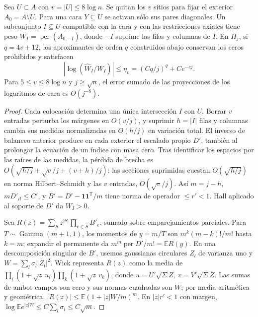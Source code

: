 \begin{proposicion}\label{prop:menores-llegada}
Sea \(U\subset A\) con \(v=|U|\le8\log n\). Se quitan los \(v\) sitios para fijar
el exterior \(A_0=A\setminus U\). Para una cara \(Y\subseteq U\) se activan sólo sus
pares diagonales. Un subconjunto \(I\subseteq U\) compatible con la cara y con las
restricciones axiales tiene peso \(W_I=\operatorname{per}(A_{0,-I})\), donde \(-I\)
suprime las filas y columnas de \(I\). En \(H_j\), si \(q=4v+12\), los aproximantes
de orden \(q\) construidos abajo conservan los ceros prohibidos y satisfacen
\[
 |\log(\widehat W_I/W_I)|\le\eta_v=(Cq/j)^q+Ce^{-cj}.
\]
Para \(5\le v\le8\log n\) y \(j\ge\sqrt n\), el error sumado de las proyecciones
de los logaritmos de cara es \(O(j^{-8})\).
\end{proposicion}
\begin{proof}
Cada colocación determina una única intersección \(I\) con \(U\). Borrar \(v\) entradas
perturba los márgenes en \(O(v/j)\), y suprimir \(h=|I|\) filas y columnas cambia sus
medidas normalizadas en \(O(h/j)\) en variación total. El inverso de balanceo anterior
produce en cada exterior el escalado propio \(D'\), también al prolongar la ecuación de
un índice con masa cero. Tras identificar los espacios por las raíces de las medidas, la
pérdida de brecha es \(O(\sqrt{h/j}+\sqrt v/j+(v+h)/j)\): las secciones suprimidas
cuestan \(O(\sqrt{h/j})\) en norma Hilbert--Schmidt y las \(v\) entradas, \(O(\sqrt v/j)\).
Así \(m=j-h\), \(mD'_{il}\le C'\), y \(B'=D'-\mathbf1\mathbf1^{\mathsf T}/m\)
tiene norma de operador \(\le r'<1\). Hall aplicado al soporte de \(D'\) da \(W_I>0\).

Sea \(R(z)=\sum_S z^{|S|}\prod_{e\in S}B'_e\), sumado sobre emparejamientos parciales.
Para \(T\sim\operatorname{Gamma}(m+1,1)\), los momentos de \(y=m/T\) son
\(m^k(m-k)!/m!\) hasta \(k=m\); expandir el permanente da
\(m^m\operatorname{per}D'/m!=\mathbb E R(y)\).
En una descomposición singular de \(B'\), usemos gaussianas circulares \(Z_l\) de varianza
uno y \(W=\sum_l\sigma_l|Z_l|^2\). Wick representa \(R(z)\) como la media de
\(\prod_i(1+\sqrt z\,u_i)\prod_k(1+\sqrt z\,v_k)\), donde
\(u=U'\sqrt\Sigma Z,\ v=V'\sqrt\Sigma\overline Z\). Las sumas de ambos campos son cero
y sus normas cuadradas son \(W\); por media aritmética y geométrica,
\(|R(z)|\le\mathbb E(1+|z|W/m)^m\). En \(|z|r'<1\) con margen,
\(\log\mathbb E e^{|z|W}\le C\sum_l\sigma_l\le C\sqrt m\).


\end{proof}

